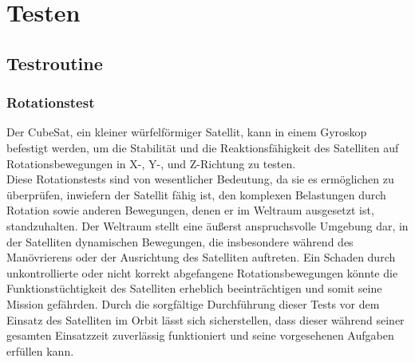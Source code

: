 \section{Testen}\label{sec: testen}

\subsection{Testroutine}\label{sec_routine}
\subsubsection{Rotationstest}
Der CubeSat, ein kleiner würfelförmiger Satellit, kann in einem Gyroskop befestigt werden, um die Stabilität und die Reaktionsfähigkeit des Satelliten auf Rotationsbewegungen in X-, Y-, und Z-Richtung zu testen. \\
\vspace{2mm}
Diese Rotationstests sind von wesentlicher Bedeutung, da sie es ermöglichen zu überprüfen, inwiefern der Satellit fähig ist, den komplexen Belastungen durch Rotation sowie anderen Bewegungen, denen er im Weltraum ausgesetzt ist, standzuhalten. Der Weltraum stellt eine äußerst anspruchsvolle Umgebung dar, in der Satelliten dynamischen Bewegungen, die insbesondere während des Manövrierens oder der Ausrichtung des Satelliten auftreten. Ein Schaden durch unkontrollierte oder nicht korrekt abgefangene Rotationsbewegungen könnte die Funktionstüchtigkeit des Satelliten erheblich beeinträchtigen und somit seine Mission gefährden. Durch die sorgfältige Durchführung dieser Tests vor dem Einsatz des Satelliten im Orbit lässt sich sicherstellen, dass dieser während seiner gesamten Einsatzzeit zuverlässig funktioniert und seine vorgesehenen Aufgaben erfüllen kann.



